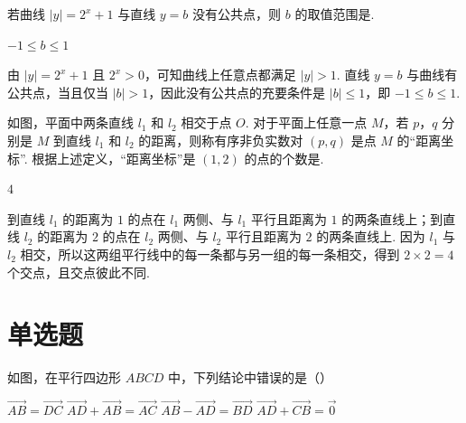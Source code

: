 \begin{problem}
若曲线 \(|y| = 2^x + 1\) 与直线 \(y = b\) 没有公共点，则 \(b\) 的取值范围是\fillinblank{}.
\end{problem}

\begin{answer}
\(-1\leqslant b\leqslant 1\)
\end{answer}

\begin{solution}
由 \(|y|=2^x+1\) 且 \(2^x>0\)，可知曲线上任意点都满足 \(|y|>1\). 直线 \(y=b\) 与曲线有公共点，当且仅当 \(|b|>1\)，因此没有公共点的充要条件是 \(|b|\leqslant1\)，即 \(-1\leqslant b\leqslant1\).
\end{solution}

\begin{problem}
如图，平面中两条直线 \(l_{1}\) 和 \(l_{2}\) 相交于点 \(O\). 对于平面上任意一点 \(M\)，若 \(p\)，\(q\) 分别是 \(M\) 到直线 \(l_{1}\) 和 \(l_{2}\) 的距离，则称有序非负实数对 \((p, q)\) 是点 \(M\) 的“距离坐标”. 根据上述定义，“距离坐标”是 \((1,2)\) 的点的个数是\fillinblank{}.
\end{problem}

\begin{answer}
\(4\)
\end{answer}

\begin{solution}
到直线 \(l_1\) 的距离为 \(1\) 的点在 \(l_1\) 两侧、与 \(l_1\) 平行且距离为 \(1\) 的两条直线上；到直线 \(l_2\) 的距离为 \(2\) 的点在 \(l_2\) 两侧、与 \(l_2\) 平行且距离为 \(2\) 的两条直线上. 因为 \(l_1\) 与 \(l_2\) 相交，所以这两组平行线中的每一条都与另一组的每一条相交，得到 \(2\times2=4\) 个交点，且交点彼此不同.
\end{solution}

\section{单选题}
\begin{problem}
如图，在平行四边形 \(ABCD\) 中，下列结论中错误的是（\quad）


\choices
    {\(\overrightarrow{AB} = \overrightarrow{DC}\)}
    {\(\overrightarrow{AD} + \overrightarrow{AB} = \overrightarrow{AC}\)}
    {\(\overrightarrow{AB} - \overrightarrow{AD} = \overrightarrow{BD}\)}
    {\(\overrightarrow{AD} + \overrightarrow{CB} = \overrightarrow{0}\)}
\end{problem}

